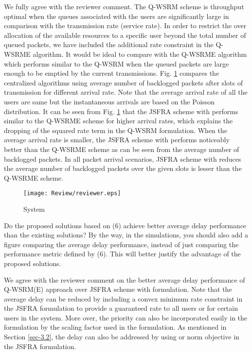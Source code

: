 \resp We fully agree with the reviewer comment. The Q-WSRM scheme is throughput optimal when the queues associated with the users are significantly large in comparison with the transmission rate (service rate). In order to restrict the over allocation of the available resources to a specific user beyond the total number of queued packets, we have included the additional rate constraint in the Q-WSRME algorithm. It would be ideal to compare with the Q-WSRME algorithm which performs similar to the Q-WSRM when the queued packets are large enough to be emptied by the current transmissions. Fig. \ref{fig-review} compares the centralized algorithms using average number of backlogged packets after  slots of transmission for different arrival rate. Note that the average arrival rate of all the users are same but the instantaneous arrivals are based on the Poisson distribution. It can be seen from Fig. \ref{fig-review} that the JSFRA scheme with  performs similar to the Q-WSRME scheme for higher arrival rates, which explains the dropping of the squared rate term in the Q-WSRM formulation. When the average arrival rate is smaller, the JSFRA scheme with  performs noticeably better than the Q-WSRME scheme as can be seen from the average number of backlogged packets. In all packet arrival scenarios, JSFRA scheme with  reduces the average number of backlogged packets over the given slots is lesser than the Q-WSRME scheme.
\begin{figure}
\centering
\texttt{[image: Review/reviewer.eps]}
\label{fig-review}
\caption{System }
\end{figure}

 Do the proposed solutions based on (6) achieve better average delay performance than the existing solutions? By the way, in the simulations, you should also add a figure comparing the average delay performance, instead of just comparing the performance metric defined by (6). This will better justify the advantage of the proposed solutions.

\resp We agree with the reviewer comment on the better average delay performance of Q-WSRM(E) approach over JSFRA scheme with  formulation. Note that the average delay can be reduced by including a convex minimum rate constraint in the JSFRA formulation to provide a guaranteed rate to all users or for certain users in the system. More over, the priority can also be incorporated easily in the formulation by the scaling factor  used in the formulation. As mentioned in Section \ref{sec-3.2}, the delay can also be addressed by using  or  norm objective in the JSFRA formulation.

